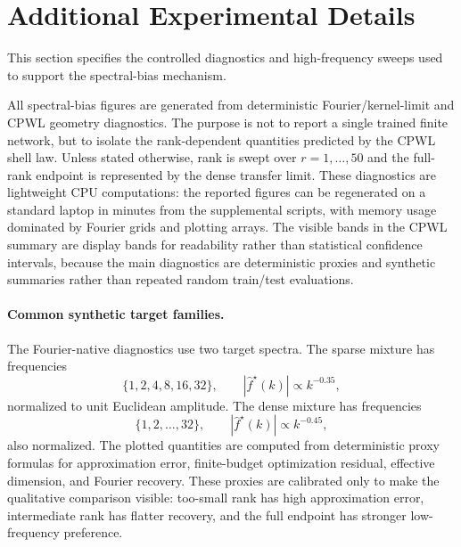 \section{Additional Experimental Details}
\label{app:exp-details}

This section specifies the controlled diagnostics and high-frequency sweeps used to support the spectral-bias mechanism.

All spectral-bias figures are generated from deterministic Fourier/kernel-limit and CPWL geometry diagnostics. The purpose is not to report a single trained finite network, but to isolate the rank-dependent quantities predicted by the CPWL shell law. Unless stated otherwise, rank is swept over $r=1,\ldots,50$ and the full-rank endpoint is represented by the dense transfer limit.
These diagnostics are lightweight CPU computations: the reported figures can be regenerated on a standard laptop in minutes from the supplemental scripts, with memory usage dominated by Fourier grids and plotting arrays. The visible bands in the CPWL summary are display bands for readability rather than statistical confidence intervals, because the main diagnostics are deterministic proxies and synthetic summaries rather than repeated random train/test evaluations.

\paragraph{Common synthetic target families.}
The Fourier-native diagnostics use two target spectra. The sparse mixture has frequencies
\begin{equation}
\{1,2,4,8,16,32\},
\qquad
|\widehat f^\star(k)|\propto k^{-0.35},
\end{equation}
normalized to unit Euclidean amplitude. The dense mixture has frequencies
\begin{equation}
\{1,2,\ldots,32\},
\qquad
|\widehat f^\star(k)|\propto k^{-0.45},
\end{equation}
also normalized. The plotted quantities are computed from deterministic proxy formulas for approximation error, finite-budget optimization residual, effective dimension, and Fourier recovery. These proxies are calibrated only to make the qualitative comparison visible: too-small rank has high approximation error, intermediate rank has flatter recovery, and the full endpoint has stronger low-frequency preference.

